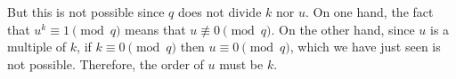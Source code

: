 But this is not possible since $q$ does not divide ${k}$ nor ${u}$. On one hand, the fact that ${u}^{{k}}\equiv 1\pmod{q}$ means that ${u}\not\equiv 0\pmod{q}$. On the other hand, since ${u}$ is a multiple of ${k}$, if ${k}\equiv 0\pmod{q}$ then ${u}\equiv 0\pmod{q}$, which we have just seen is not possible. Therefore, the order of ${u}$ must be ${k}$.